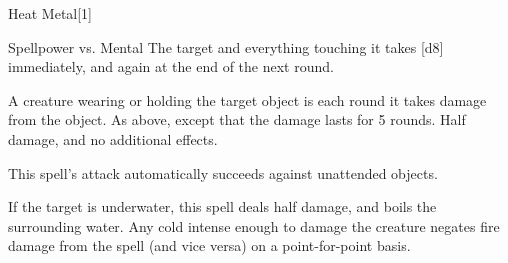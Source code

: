 \begin{spellsection}{Heat Metal}[1]
    \begin{spellheader}
    \end{spellheader}
    \begin{spellcontent}
        \begin{spelltargetinginfo}
        \end{spelltargetinginfo}
        \begin{spelleffects}
            \begin{spellattack}{Spellpower vs. Mental}
                \spellsuccess The target and everything touching it takes [d8] immediately, and again at the end of the next round.

                A creature wearing or holding the target object is \dazed each round it takes damage from the object.
                \spellcritical As above, except that the damage lasts for 5 rounds.
                \spellfailure Half damage, and no additional effects.
            \end{spellattack}
        \end{spelleffects}
    \end{spellcontent}
    \begin{spellfooter}
        \spellnotes This spell's attack automatically succeeds against unattended objects.

        If the target is underwater, this spell deals half damage, and boils the surrounding water. Any cold intense enough to damage the creature negates fire damage from the spell (and vice versa) on a point-for-point basis.
        \miscastrandom
    \end{spellfooter}
\end{spellsection}

